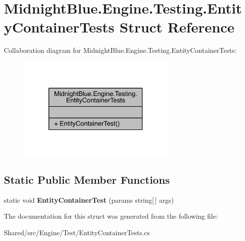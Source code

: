 \hypertarget{struct_midnight_blue_1_1_engine_1_1_testing_1_1_entity_container_tests}{}\section{Midnight\+Blue.\+Engine.\+Testing.\+Entity\+Container\+Tests Struct Reference}
\label{struct_midnight_blue_1_1_engine_1_1_testing_1_1_entity_container_tests}


Collaboration diagram for Midnight\+Blue.\+Engine.\+Testing.\+Entity\+Container\+Tests\+:
\nopagebreak
\begin{figure}[H]
\begin{center}
\leavevmode
\includegraphics[width=225pt]{struct_midnight_blue_1_1_engine_1_1_testing_1_1_entity_container_tests__coll__graph}
\end{center}
\end{figure}
\subsection*{Static Public Member Functions}
\begin{DoxyCompactItemize}
\item 
\hypertarget{struct_midnight_blue_1_1_engine_1_1_testing_1_1_entity_container_tests_a16963d879645a0ca9af281ae004f69fb}{}\label{struct_midnight_blue_1_1_engine_1_1_testing_1_1_entity_container_tests_a16963d879645a0ca9af281ae004f69fb} 
static void {\bfseries Entity\+Container\+Test} (params string\mbox{[}$\,$\mbox{]} args)
\end{DoxyCompactItemize}


The documentation for this struct was generated from the following file\+:\begin{DoxyCompactItemize}
\item 
Shared/src/\+Engine/\+Test/Entity\+Container\+Tests.\+cs\end{DoxyCompactItemize}
